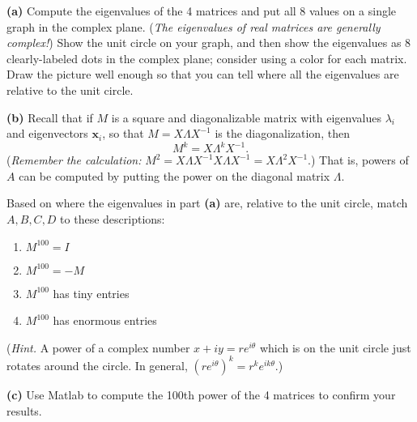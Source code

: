\documentclass[12pt]{amsart}
\newcommand{\bx}{\bm{x}}
\newcommand{\epart}[1]{\medskip\noindent\textbf{(#1)}\quad }
\begin{document}
\epart{a}  Compute the eigenvalues of the 4 matrices and put all 8 values on a single graph in the complex plane.  (\emph{The eigenvalues of real matrices are generally complex!})  Show the unit circle on your graph, and then show the eigenvalues as 8 clearly-labeled dots in the complex plane; consider using a color for each matrix.  Draw the picture well enough so that you can tell where all the eigenvalues are relative to the unit circle.

\epart{b}  Recall that if $M$ is a square and diagonalizable matrix with eigenvalues $\lambda_i$ and eigenvectors $\bx_i$, so that $M=X \Lambda X^{-1}$ is the diagonalization, then
    $$M^{k} = X \Lambda^{k} X^{-1}.$$
(\emph{Remember the calculation:} $M^2 = X \Lambda X^{-1} X \Lambda X^{-1} = X \Lambda^2 X^{-1}$.)  That is, powers of $A$ can be computed by putting the power on the diagonal matrix $\Lambda$.

Based on where the eigenvalues in part \textbf{(a)} are, relative to the unit circle, match $A,B,C,D$ to these descriptions:
\renewcommand{\labelenumi}{\arabic{enumi}.}
\begin{enumerate}
\item $M^{100}=I$
\item $M^{100}=-M$
\item $M^{100}$ has tiny entries
\item $M^{100}$ has enormous entries
\end{enumerate}
(\emph{Hint.} A power of a complex number $x+iy = r e^{i\theta}$ which is on the unit circle just rotates around the circle.  In general, $(r e^{i\theta})^k = r^k e^{ik\theta}$.)

\epart{c}  Use Matlab to compute the 100th power of the 4 matrices to confirm your results.
\end{document}
